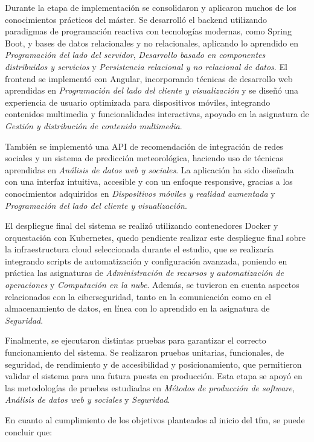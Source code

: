 Durante la etapa de implementación se consolidaron y aplicaron muchos de los conocimientos prácticos del máster. Se desarrolló el \gls{backend} utilizando paradigmas de programación reactiva con tecnologías modernas, como Spring Boot, y bases de datos relacionales y no relacionales, aplicando lo aprendido en \textit{Programación del lado del servidor}, \textit{Desarrollo basado en componentes distribuidos y servicios} y \textit{Persistencia relacional y no relacional de datos}. El frontend se implementó con Angular, incorporando técnicas de desarrollo web aprendidas en \textit{Programación del lado del cliente y visualización} y se diseñó una experiencia de usuario optimizada para dispositivos móviles, integrando contenidos multimedia y funcionalidades interactivas, apoyado en la asignatura de \textit{Gestión y distribución de contenido multimedia}.

También se implementó una \gls{API} de recomendación de integración de redes sociales y un sistema de predicción meteorológica, haciendo uso de técnicas aprendidas en \textit{Análisis de datos web y sociales}. La aplicación ha sido diseñada con una interfaz intuitiva, accesible y con un enfoque responsive, gracias a los conocimientos adquiridos en \textit{Dispositivos móviles y realidad aumentada} y \textit{Programación del lado del cliente y visualización}.

El despliegue final del sistema se realizó utilizando contenedores Docker y orquestación con Kubernetes, quedo pendiente realizar este despliegue final sobre la infraestructura cloud seleccionada durante el estudio, que se realizaría integrando scripts de automatización y configuración avanzada, poniendo en práctica las asignaturas de \textit{Administración de recursos y automatización de operaciones} y \textit{Computación en la nube}. Además, se tuvieron en cuenta aspectos relacionados con la ciberseguridad, tanto en la comunicación como en el almacenamiento de datos, en línea con lo aprendido en la asignatura de \textit{Seguridad}.

Finalmente, se ejecutaron distintas pruebas para garantizar el correcto funcionamiento del sistema. Se realizaron pruebas unitarias, funcionales, de seguridad, de rendimiento y de accesibilidad y posicionamiento, que permitieron validar el sistema para una futura puesta en producción. Esta etapa se apoyó en las metodologías de pruebas estudiadas en \textit{Métodos de producción de software}, \textit{Análisis de datos web y sociales} y \textit{Seguridad}.

En cuanto al cumplimiento de los objetivos planteados al inicio del \gls{tfm}, se puede concluir que:

